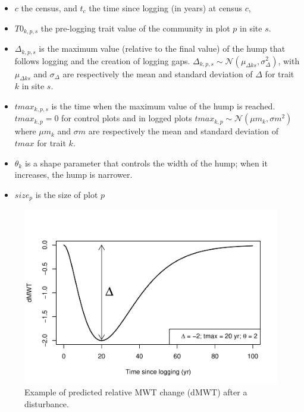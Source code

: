 \documentclass[]{elsarticle} %
\makeatletter
\def\maxwidth{\ifdim\Gin@nat@width>\linewidth\linewidth
\else\Gin@nat@width\fi}
\let\Oldincludegraphics\includegraphics
\renewcommand{\includegraphics}[1]{\Oldincludegraphics[width=\maxwidth]{#1}}
\makeatother
\begin{document}
\begin{itemize}
\item
  \(c\) the census, and \(t_c\) the time since logging (in years) at
  census \(c\),
\item
  \(T0_{k,p,s}\) the pre-logging trait value of the community in plot
  \(p\) in site \(s\).
\item
  \(\Delta_{k,p,s}\) is the maximum value (relative to the final value)
  of the hump that follows logging and the creation of logging gaps.
  \(\Delta_{k,p,s} \sim \mathcal{N} (\mu_{\Delta ks}, \sigma_{\Delta}^2)\),
  with \(\mu_{\Delta ks}\) and \(\sigma_{\Delta}\) are respectively the
  mean and standard deviation of \(\Delta\) for trait \(k\) in site
  \(s\).
\item
  \(tmax_{k,p,s}\) is the time when the maximum value of the hump is
  reached. \(tmax_{k,p} = 0\) for control plots and in logged plots
  \(tmax_{k,p} \sim \mathcal{N} (\mu m_{ k}, \sigma m^2)\) where
  \(\mu m_{k}\) and \(\sigma m\) are respectively the mean and standard
  deviation of \(tmax\) for trait \(k\).
\item
  \(\theta_k\) is a shape parameter that controls the width of the hump;
  when it increases, the hump is narrower.
\item
  \(size_p\) is the size of plot \(p\)
\end{itemize}

\begin{figure}
\centering
\includegraphics{rticle_tmfo_functional_files/figure-latex/method_example-1.pdf}
\caption{Example of predicted relative MWT change (dMWT) after a
disturbance.}
\end{figure}
\end{document}
